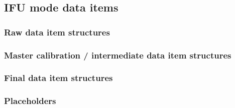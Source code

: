 \subsection{IFU mode data items}\label{ssec:lms_drl_items_structures}
\subsubsection{Raw data item structures}\label{sssec:lmsrawdatastructs}
\subsubsection{Master calibration / intermediate data item structures}\label{sssec:lmsprocdatastructs}
\subsubsection{Final data item structures}\label{sssec:lmsfinaldatastructs}

\subsubsection{Placeholders}

\paragraph{\hyperref[dataitem:ifu_sci_reduced_tac]{}}\label{dataitem:ifu_sci_reduced_tac}


\paragraph{\hyperref[dataitem:master_flat_ifu]{}}\label{dataitem:master_flat_ifu}


\paragraph{\hyperref[dataitem:ifu_wavecal]{}}\label{dataitem:ifu_wavecal}


